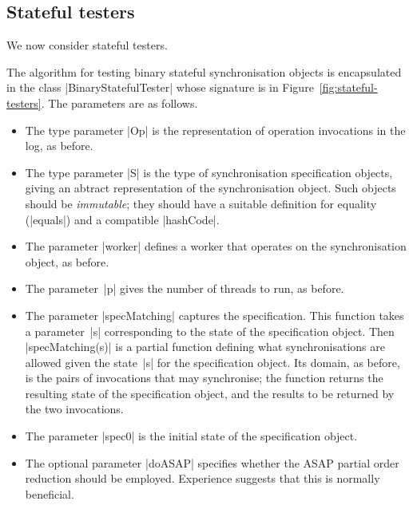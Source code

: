 \subsection{Stateful testers}

We now consider stateful testers.  

The algorithm for testing binary stateful synchronisation objects is
encapsulated in the class |BinaryStatefulTester| whose signature is in
Figure~\ref{fig:stateful-testers}.  The parameters are as follows.
%
\begin{itemize}
\item The type parameter |Op| is the representation of operation invocations
  in the log, as before.

\item The type parameter |S| is the type of synchronisation specification
  objects, giving an abtract representation of the synchronisation object.
  Such objects should be \emph{immutable}; they should have a suitable
  definition for equality (|equals|) and a compatible |hashCode|.

\item The parameter |worker| defines a worker that operates on the
  synchronisation object, as before.

\item The parameter~|p| gives the number of threads to run, as before.

\item The parameter |specMatching| captures the specification.  This function
  takes a parameter~|s| corresponding to the state of the specification
  object.  Then |specMatching(s)| is a partial function defining what
  synchronisations are allowed given the state~|s| for the specification
  object.  Its domain, as before, is the pairs of invocations that may
  synchronise; the function returns the resulting state of the specification
  object, and the results to be returned by the two invocations.

\item The parameter |spec0| is the initial state of the specification object.

\item The optional parameter |doASAP| specifies whether the ASAP partial order
  reduction should be employed.  Experience suggests that this is normally
  beneficial. 
\end{itemize}


